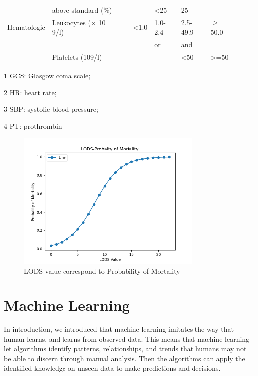 \documentclass[12pt,a4paper,english
]{tunithesis}
\begin{document}
\begin{landscape}
\begin{table}[]
\begin{threeparttable}
\begin{tabular}{lllllllll}
             & above standard (\%) &  &  & \textless{}25 & 25 &  &  &  \\
            Hematologic & Leukocytes (× 10 9/l) & - & \textless{}1.0 & 1.0-2.4 & 2.5-49.9 & $\geq$50.0 & - & - \\
             &  &  &  & or & and &  &  &  \\
             & Platelets (109/l) & - & - & - & \textless{}50 & \textgreater{}=50 &  &  \\
             \hline
        \end{tabular}
        \begin{tablenotes}
            \item[1] GCS: Glasgow coma scale; 
            \item[2] HR: heart rate; 
            \item[3] SBP: systolic blood pressure;        
            \item[4] PT: prothrombin
        \end{tablenotes}
        \end{threeparttable}
    \end{table}
\end{landscape}

\begin{figure}
  \begin{center}
    \includegraphics[width=0.8\textwidth]{thesis/img/lod_mortality_1.png}
    
  \end{center}
  \caption[LODS-Probability of Mortality]{LODS value correspond to Probability of Mortality}
  \label{fig:lods_mortality}
\end{figure}



\section{Machine Learning}
In introduction, we introduced that machine learning imitates the way that human learns, and learns from observed data. This means that machine learning let algorithms identify patterns, relationships, and trends that humans may not be able to discern through manual analysis. Then the algorithms can apply the identified knowledge on unseen data to make predictions and decisions. 
\end{document}

